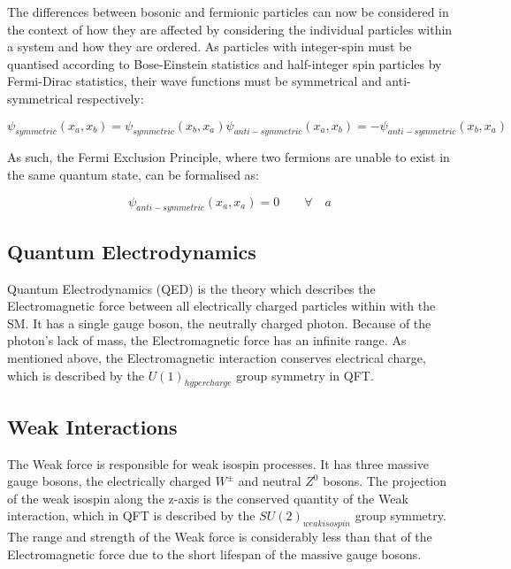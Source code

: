 The differences between bosonic and fermionic particles can now be considered in the context of how they are affected by considering the individual particles within a system and how they are ordered. 
As particles with integer-spin must be quantised according to Bose-Einstein statistics and half-integer spin particles by Fermi-Dirac statistics, their wave functions must be symmetrical and anti-symmetrical respectively\cite{QM}:

\begin{equation}
\psi_{symmetric}(x_{a},x_{b}) = \psi_{symmetric}(x_{b},x_{a})
\psi_{anti-symmetric}(x_{a},x_{b}) = -\psi_{anti-symmetric}(x_{b},x_{a})
\end{equation}

As such, the Fermi Exclusion Principle, where two fermions are unable to exist in the same quantum state, can be formalised as\cite{QM}:

\begin{equation}
\psi_{anti-symmetric}(x_{a},x_{a}) = 0 \qquad \forall \quad a
\end{equation}

\subsection{Quantum Electrodynamics}\label{subsec:QED}
Quantum Electrodynamics (QED) is the theory which describes the Electromagnetic force between all electrically charged particles within with the SM. 
It has a single gauge boson, the neutrally charged photon. 
Because of the photon's lack of mass, the Electromagnetic force has an infinite range. 
As mentioned above, the Electromagnetic interaction conserves electrical charge, which is described by the $U(1)_{hypercharge}$ group symmetry in QFT\cite{QFT}. 

\subsection{Weak Interactions}\label{subsec:weakForce}
The Weak force is responsible for weak isospin processes. 
It has three massive gauge bosons, the electrically charged $W^{\pm}$ and neutral $Z^{0}$ bosons. 
The projection of the weak isospin along the z-axis is the conserved quantity of the Weak interaction, which in QFT is described by the $SU(2)_{weak isospin}$ group symmetry. 
The range and strength of the Weak force is considerably less than that of the Electromagnetic force due to the short lifespan of the massive gauge bosons\cite{ElectroweakStrong}. 

